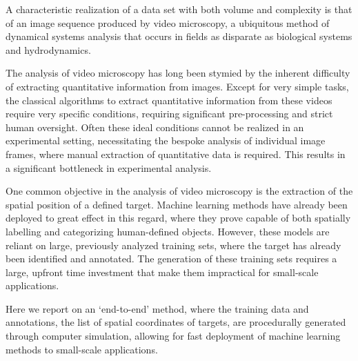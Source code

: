 \documentclass[twoside,twocolumn,9pt]{article}
\begin{document}

A characteristic realization of a data set with both volume and complexity is that of an image sequence produced by video microscopy, a ubiquitous method of dynamical systems analysis that occurs in fields as disparate as biological systems\cite{kner_super-resolution_2009,Langebasicsimmunofluorescencevideomicroscopy1995} and hydrodynamics\cite{crocker_methods_1996,kellay_hydrodynamics_2017}.

The analysis of video microscopy has long been stymied by the inherent difficulty of extracting quantitative information from images\cite{baumgartl_limits_2005}.  Except for very simple tasks, the classical algorithms to extract quantitative information from these videos require very specific conditions\cite{conte_thirty_2004}, requiring significant pre-processing and strict human oversight. Often these ideal conditions cannot be realized in an experimental setting, necessitating the bespoke analysis of individual image frames, where manual extraction of quantitative data is required. This results in a significant bottleneck in experimental analysis.

One common objective in the analysis of video microscopy is the extraction of the spatial position of a defined target. Machine learning methods have already been deployed to great effect in this regard, where they prove capable of both spatially labelling and categorizing human-defined objects\cite{ErhanScalableObjectDetection2014,BlaschkoLearningLocalizeObjects2008}. However, these models are reliant on large, previously analyzed training sets, where the target has already been identified and annotated. The generation of these training sets requires a large, upfront time investment that make them impractical for small-scale applications.

Here we report on an `end-to-end' method, where the training data and annotations, the list of spatial coordinates of targets, are procedurally generated through computer simulation, allowing for fast deployment of machine learning methods to small-scale applications.

\end{document}
